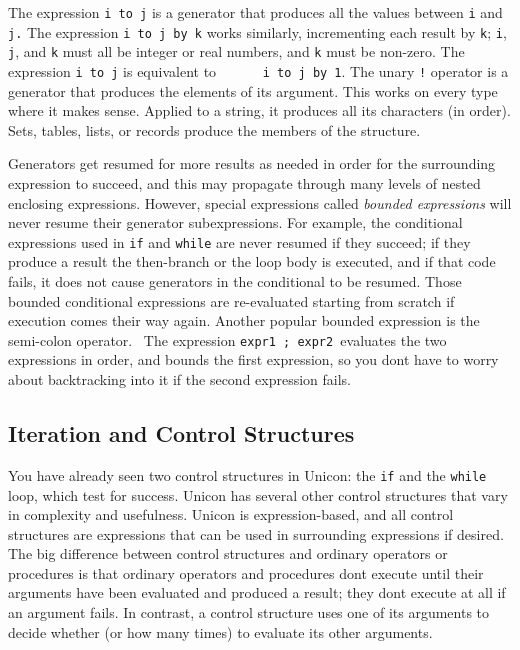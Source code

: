 The expression \texttt{i }\texttt{to j} is a
generator that produces all the values between \texttt{i} and
\texttt{j.} The expression \texttt{i to j }\texttt{by k} works similarly, incrementing each result by
\texttt{k}; \texttt{i}, \texttt{j}, and \texttt{k} must all be integer
or real numbers, and \texttt{k} must be non-zero. The expression
\texttt{i to j} is equivalent to \ \ \ \ \ \ \texttt{i to j by 1}. The
unary \texttt{!} operator is a generator
that produces the elements of its argument. This works on every type
where it makes sense. Applied to a string, it produces all its
characters (in order). Sets, tables, lists, or records produce the
members of the structure.

Generators get resumed for more results as needed in order for the
surrounding expression to succeed, and this may propagate through many
levels of nested enclosing expressions. However, special expressions
called \textit{bounded expressions} will
never resume their generator subexpressions. For example, the
conditional expressions used in \texttt{if} and \texttt{while} are
never resumed if they succeed; if they produce a result the then-branch
or the loop body is executed, and if that code fails, it does not cause
generators in the conditional to be resumed. Those bounded conditional
expressions are re-evaluated starting from scratch if execution comes
their way again. Another popular bounded expression is the semi-colon
operator. \ The expression \texttt{expr1 ; expr2 }evaluates the two
expressions in order, and bounds the first expression, so you
don{\textquotesingle}t have to worry about backtracking into it if the
second expression fails.

\subsection{Iteration and Control Structures}

You have already seen two control structures in Unicon: the \texttt{if}
and the \texttt{while} loop, which test for success.
Unicon has several other control structures that vary in complexity and
usefulness. Unicon is expression-based, and all control structures are
expressions that can be used in surrounding expressions if desired. The
big difference between control structures and ordinary operators or
procedures is that ordinary operators and procedures
don{\textquotesingle}t execute until their arguments have been
evaluated and produced a result; they don{\textquotesingle}t execute at
all if an argument fails. In contrast, a control structure uses one of
its arguments to decide whether (or how many times) to evaluate its
other arguments.

